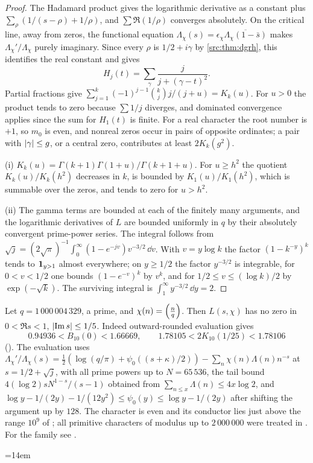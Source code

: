 \begin{proof}
The Hadamard product gives the logarithmic derivative as a constant plus $\sum_\rho(1/(s-\rho)+1/\rho)$,
and $\sum\Re(1/\rho)$ converges absolutely. On the critical line, away from zeros, the functional equation
$\Lambda_\chi(s)=\epsilon_\chi\overline{\Lambda_\chi(1-\bar s)}$ makes $\Lambda_\chi'/\Lambda_\chi$ purely
imaginary. Since every $\rho$ is $1/2+i\gamma$ by \cref{src:thm:dgrh}, this identifies the real constant
and gives
\[
 H_j(t)=\sum_\gamma\frac j{j+(\gamma-t)^2}.
\]
Partial fractions give $\sum_{j=1}^k(-1)^{j-1}\binom kjj/(j+u)=K_k(u)$. For $u>0$ the product tends to zero
because $\sum1/j$ diverges, and dominated convergence applies since the sum for $H_1(t)$ is finite. For a
real character the root number is $+1$, so $m_0$ is even, and nonreal zeros occur in pairs of opposite
ordinates; a pair with $\lvert\gamma\rvert\le g$, or a central zero, contributes at least $2K_k(g^2)$.

(i) $K_k(u)=\Gamma(k+1)\Gamma(1+u)/\Gamma(k+1+u)$. For $u\ge h^2$ the quotient $K_k(u)/K_k(h^2)$ decreases
in $k$, is bounded by $K_1(u)/K_1(h^2)$, which is summable over the zeros, and tends to zero for $u>h^2$.

(ii) The gamma terms are bounded at each of the finitely many arguments, and the logarithmic derivatives
of $L$ are bounded uniformly in $q$ by their absolutely convergent prime-power series. The integral follows
from $\sqrt j=(2\sqrt\pi)^{-1}\int_0^\infty(1-e^{-jv})v^{-3/2}\,\dd v$. With $v=y\log k$ the factor
$(1-k^{-y})^k$ tends to $\mathbf{1}_{y>1}$ almost everywhere; on $y\ge1/2$ the factor $y^{-3/2}$ is
integrable, for $0<v<1/2$ one bounds $(1-e^{-v})^k$ by $v^k$, and for $1/2\le v\le(\log k)/2$ by
$\exp(-\sqrt k)$. The surviving integral is $\int_1^\infty y^{-3/2}\,\dd y=2$.
\end{proof}

\begin{example}\label{hec:ex:chowla}
Let $q=1\,000\,004\,329$, a prime, and $\chi(n)=\Bigl(\frac{n}{q}\Bigr)$. Then $L(s,\chi)$ has no zero in
$0<\Re s<1$, $\lvert\operatorname{Im} s\rvert\le1/5$. Indeed outward-rounded evaluation gives
\[
 0.94936<B_{10}(0)<1.66669,\qquad1.78105<2K_{10}(1/25)<1.78106
\]
(). The evaluation uses
$\Lambda_\chi'/\Lambda_\chi(s)=\tfrac12(\log(q/\pi)+\psi_0((s+\kappa)/2))-\sum_n\chi(n)\Lambda(n)n^{-s}$ at
$s=1/2+\sqrt j$, with all prime powers up to $N=65\,536$, the tail bound $4(\log2)sN^{1-s}/(s-1)$ obtained
from $\sum_{n\le x}\Lambda(n)\le4x\log2$, and
$\log y-1/(2y)-1/(12y^2)\le\psi_0(y)\le\log y-1/(2y)$ after shifting the argument up by $128$. The character
is even and its conductor lies just above the range $10^9$ of \cite{PlattTrudgian2026Even}; all primitive
characters of modulus up to $2\,000\,000$ were treated in \cite{Platt2016Numerical}. For the family see
\cite{Soundararajan2000Nonvanishing}.
{\emergencystretch=14em\par}
\end{example}

